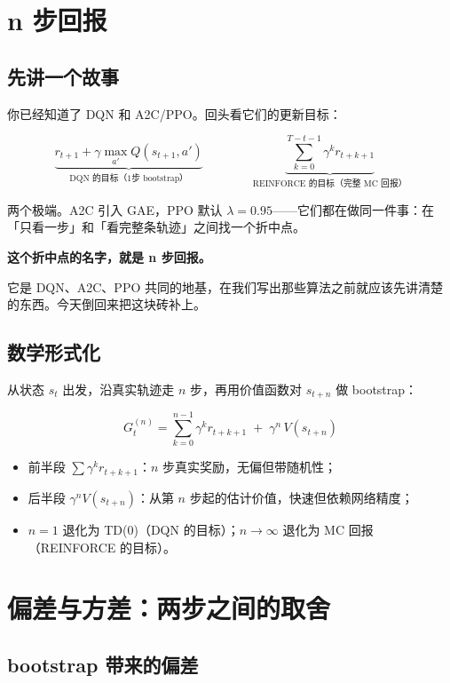 \documentclass{article}
\begin{document}
\section*{n 步回报}

\subsection*{先讲一个故事}

你已经知道了 DQN 和 A2C/PPO。回头看它们的更新目标：

\[
\underbrace{r_{t+1} + \gamma \max_{a'} Q(s_{t+1}, a')}_{\text{DQN 的目标（1步 bootstrap）}}
\qquad\qquad
\underbrace{\sum_{k=0}^{T-t-1} \gamma^k r_{t+k+1}}_{\text{REINFORCE 的目标（完整 MC 回报）}}
\]

两个极端。A2C 引入 GAE，PPO 默认 $\lambda=0.95$——它们都在做同一件事：在「只看一步」和「看完整条轨迹」之间找一个折中点。

\textbf{这个折中点的名字，就是 n 步回报。}

它是 DQN、A2C、PPO 共同的地基，在我们写出那些算法之前就应该先讲清楚的东西。今天倒回来把这块砖补上。

\subsection*{数学形式化}

从状态 $s_t$ 出发，沿真实轨迹走 $n$ 步，再用价值函数对 $s_{t+n}$ 做 bootstrap：

\[
\boxed{G_t^{(n)} = \sum_{k=0}^{n-1} \gamma^k r_{t+k+1} \;+\; \gamma^n\, V(s_{t+n})}
\]

\begin{itemize}
  \item 前半段 $\sum \gamma^k r_{t+k+1}$：$n$ 步真实奖励，无偏但带随机性；
  \item 后半段 $\gamma^n V(s_{t+n})$：从第 $n$ 步起的估计价值，快速但依赖网络精度；
  \item $n=1$ 退化为 TD(0)（DQN 的目标）；$n \to \infty$ 退化为 MC 回报（REINFORCE 的目标）。
\end{itemize}

\section*{偏差与方差：两步之间的取舍}

\subsection*{bootstrap 带来的偏差}
\end{document}
